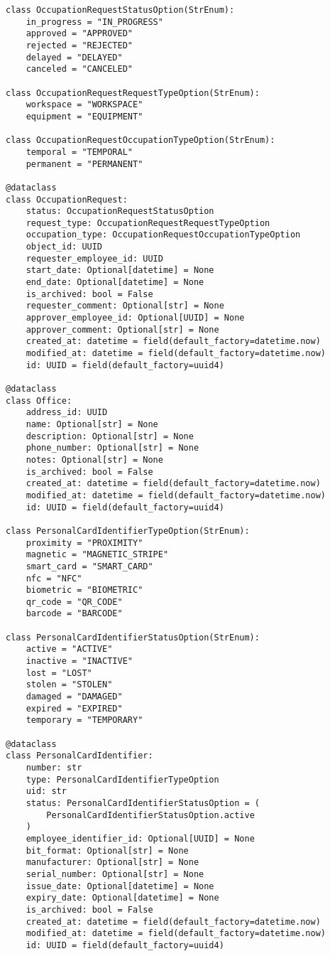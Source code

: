 \begin{lstlisting}[style=pythonstyle]
class OccupationRequestStatusOption(StrEnum):
    in_progress = "IN_PROGRESS"
    approved = "APPROVED"
    rejected = "REJECTED"
    delayed = "DELAYED"
    canceled = "CANCELED"

class OccupationRequestRequestTypeOption(StrEnum):
    workspace = "WORKSPACE"
    equipment = "EQUIPMENT"

class OccupationRequestOccupationTypeOption(StrEnum):
    temporal = "TEMPORAL"
    permanent = "PERMANENT"

@dataclass
class OccupationRequest:
    status: OccupationRequestStatusOption
    request_type: OccupationRequestRequestTypeOption
    occupation_type: OccupationRequestOccupationTypeOption
    object_id: UUID
    requester_employee_id: UUID
    start_date: Optional[datetime] = None
    end_date: Optional[datetime] = None
    is_archived: bool = False
    requester_comment: Optional[str] = None
    approver_employee_id: Optional[UUID] = None
    approver_comment: Optional[str] = None
    created_at: datetime = field(default_factory=datetime.now)
    modified_at: datetime = field(default_factory=datetime.now)
    id: UUID = field(default_factory=uuid4)

@dataclass
class Office:
    address_id: UUID
    name: Optional[str] = None
    description: Optional[str] = None
    phone_number: Optional[str] = None
    notes: Optional[str] = None
    is_archived: bool = False
    created_at: datetime = field(default_factory=datetime.now)
    modified_at: datetime = field(default_factory=datetime.now)
    id: UUID = field(default_factory=uuid4)

class PersonalCardIdentifierTypeOption(StrEnum):
    proximity = "PROXIMITY"
    magnetic = "MAGNETIC_STRIPE"
    smart_card = "SMART_CARD"
    nfc = "NFC"
    biometric = "BIOMETRIC"
    qr_code = "QR_CODE"
    barcode = "BARCODE"

class PersonalCardIdentifierStatusOption(StrEnum):
    active = "ACTIVE"
    inactive = "INACTIVE"
    lost = "LOST"
    stolen = "STOLEN"
    damaged = "DAMAGED"
    expired = "EXPIRED"
    temporary = "TEMPORARY"

@dataclass
class PersonalCardIdentifier:
    number: str
    type: PersonalCardIdentifierTypeOption
    uid: str
    status: PersonalCardIdentifierStatusOption = (
        PersonalCardIdentifierStatusOption.active
    )
    employee_identifier_id: Optional[UUID] = None
    bit_format: Optional[str] = None
    manufacturer: Optional[str] = None
    serial_number: Optional[str] = None
    issue_date: Optional[datetime] = None
    expiry_date: Optional[datetime] = None
    is_archived: bool = False
    created_at: datetime = field(default_factory=datetime.now)
    modified_at: datetime = field(default_factory=datetime.now)
    id: UUID = field(default_factory=uuid4)


\end{lstlisting}
